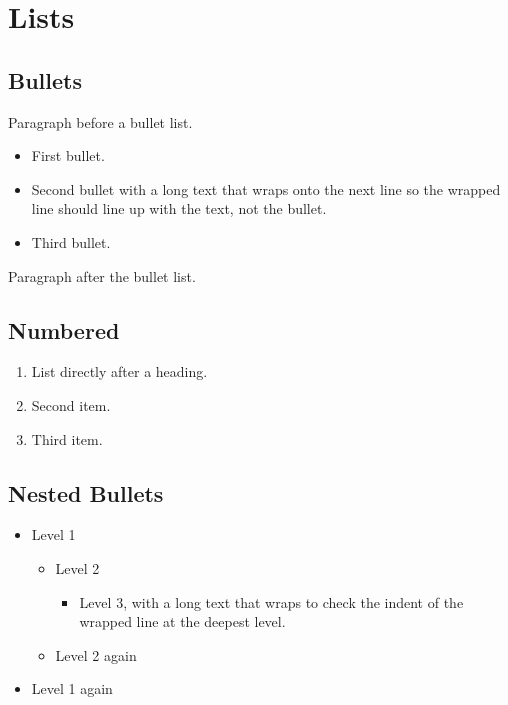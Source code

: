 \section{Lists}

\subsection{Bullets}

Paragraph before a bullet list.

\begin{itemize}
  \item First bullet.
  \item Second bullet with a long text that wraps onto the next line so the
        wrapped line should line up with the text, not the bullet.
  \item Third bullet.
\end{itemize}

Paragraph after the bullet list.

\subsection{Numbered}

\begin{enumerate}
  \item List directly after a heading.
  \item Second item.
  \item Third item.
\end{enumerate}

\subsection{Nested Bullets}

\begin{itemize}
  \item Level 1
  \begin{itemize}
    \item Level 2
    \begin{itemize}
      \item Level 3, with a long text that wraps to check the indent of the
            wrapped line at the deepest level.
    \end{itemize}
    \item Level 2 again
  \end{itemize}
  \item Level 1 again
\end{itemize}

